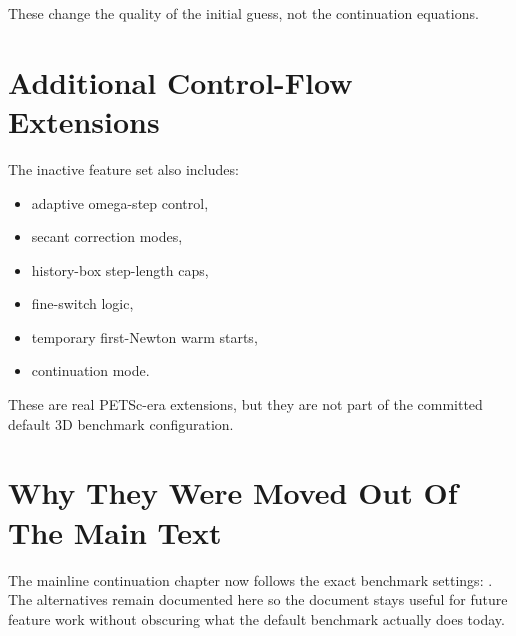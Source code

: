 These change the quality of the initial guess, not the continuation equations.

\section{Additional Control-Flow Extensions}

The inactive feature set also includes:
\begin{itemize}
\item adaptive omega-step control,
\item secant correction modes,
\item history-box step-length caps,
\item fine-switch logic,
\item temporary first-Newton warm starts,
\item {} continuation mode.
\end{itemize}

These are real PETSc-era extensions, but they are not part of the committed
default 3D benchmark configuration.

\section{Why They Were Moved Out Of The Main Text}

The mainline continuation chapter now follows the exact benchmark settings:
. The alternatives remain documented
here so the document stays useful for future feature work without obscuring what
the default benchmark actually does today.

